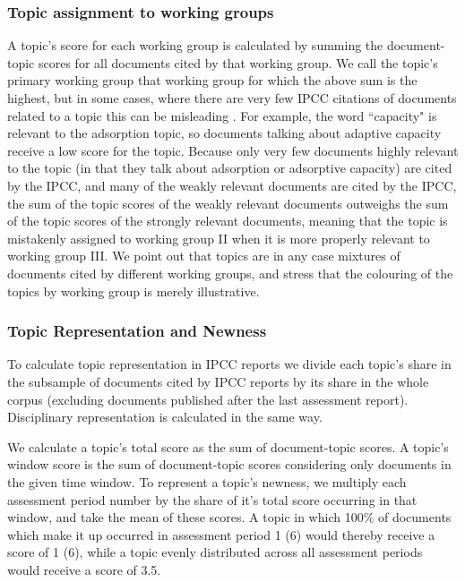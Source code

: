 \documentclass{article}
\begin{document}
\begin{linenumbers}
		
		\subsubsection*{Topic assignment to working groups}
		\label{topic-wg}
		A topic's score for each working group is calculated by summing the document-topic scores for all documents cited by that working group. We call the topic's primary working group that working group for which the above sum is the highest, but in some cases, where there are very few IPCC citations of documents related to a topic this can be misleading . For example, the word ``capacity" is relevant to the adsorption topic, so documents talking about adaptive capacity receive a low score for the topic. Because only very few documents highly relevant to the topic (in that they talk about adsorption or adsorptive capacity) are cited by the IPCC, and many of the weakly relevant documents are cited by the IPCC, the sum of the topic scores of the weakly relevant documents outweighs the sum of the topic scores of the strongly relevant documents, meaning that the topic is mistakenly assigned to working group II when it is more properly relevant to working group III. We point out that topics are in any case mixtures of documents cited by different working groups, and stress that the colouring of the topics by working group is merely illustrative.
		
		
		\subsubsection*{Topic Representation and Newness}
		
		To calculate topic representation in IPCC reports we divide each topic's share in the subsample of documents cited by IPCC reports by its share in the whole corpus (excluding documents published after the last assessment report). Disciplinary representation is calculated in the same way.
		
		We calculate a topic's total score as the sum of document-topic scores. A topic's window score is the sum of document-topic scores considering only documents in the given time window. To represent a topic's newness, we multiply each assessment period number by the share of it's total score occurring in that window, and take the mean of these scores. A topic in which 100\% of documents which make it up occurred in assessment period 1 (6) would thereby receive a score of 1 (6), while a topic evenly distributed across all assessment periods would receive a score of 3.5.
		

\end{linenumbers}
\end{document}
